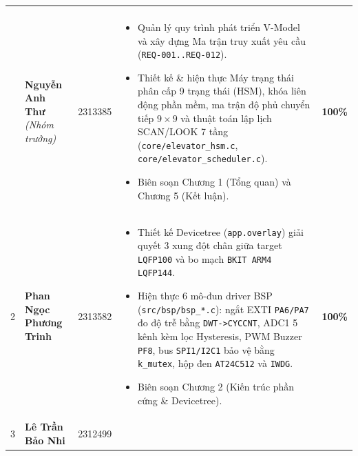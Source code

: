 \begingroup
\renewcommand{\arraystretch}{1.26}%
\setlength{\tabcolsep}{5pt}%
\fontsize{8.8}{11.2}\selectfont
{}%
\begin{xltabular}{\textwidth}{|C{0.7cm}|L{3.1cm}|C{1.5cm}|Y|C{1.6cm}|}
\hline
{}
 &  &  &  &  \\
\hline
\endfirsthead
\hline
{}
 &  &  &  &  \\
\hline
\endhead
\hline
\endfoot
\hline
{} & \textbf{Nguyễn Anh Thư} \newline \textit{(Nhóm trưởng)} & 2313385 &
\begin{itemize}[nosep, leftmargin=1.1em, topsep=1pt, partopsep=0pt]
    \item Quản lý quy trình phát triển V-Model và xây dựng Ma trận truy xuất yêu cầu (\texttt{REQ-001..REQ-012}).
    \item Thiết kế \& hiện thực Máy trạng thái phân cấp 9 trạng thái (HSM), khóa liên động phần mềm, ma trận độ phủ chuyển tiếp $9\times 9$ và thuật toán lập lịch SCAN/LOOK 7 tầng (\texttt{core/elevator\_hsm.c}, \texttt{core/elevator\_scheduler.c}).
    \item Biên soạn Chương 1 (Tổng quan) và Chương 5 (Kết luận).
\end{itemize} & \textbf{100\%} \\
\hline
{}
2 & \textbf{Phan Ngọc Phương Trinh} & 2313582 &
\begin{itemize}[nosep, leftmargin=1.1em, topsep=1pt, partopsep=0pt]
    \item Thiết kế Devicetree (\texttt{app.overlay}) giải quyết 3 xung đột chân giữa target \texttt{LQFP100} và bo mạch \texttt{BKIT ARM4 LQFP144}.
    \item Hiện thực 6 mô-đun driver BSP (\texttt{src/bsp/bsp\_*.c}): ngắt EXTI \texttt{PA6/PA7} đo độ trễ bằng \texttt{DWT->CYCCNT}, ADC1 5 kênh kèm lọc Hysteresis, PWM Buzzer \texttt{PF8}, bus \texttt{SPI1/I2C1} bảo vệ bằng \texttt{k\_mutex}, hộp đen \texttt{AT24C512} và \texttt{IWDG}.
    \item Biên soạn Chương 2 (Kiến trúc phần cứng \& Devicetree).
\end{itemize} & \textbf{100\%} \\
 & \textbf{Lê Trần Bảo Nhi} & 2312499 &
\begin{itemize}[nosep, leftmargin=1.1em, topsep=1pt, partopsep=0pt]

\end{itemize}
\end{xltabular}
